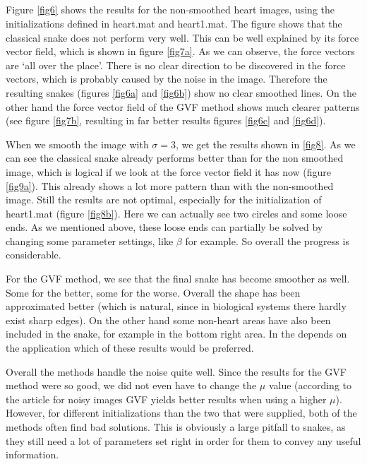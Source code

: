 \documentclass{article}
\begin{document}
\subsection{}
Figure \ref{fig6} shows the results for the non-smoothed heart images, using the initializations defined in heart.mat and heart1.mat. The figure shows that the classical snake does not perform very well. This can be well explained by its force vector field, which is shown in figure \ref{fig7a}. As we can observe, the force vectors are `all over the place'. There is no clear direction to be discovered in the force vectors, which is probably caused by the noise in the image. Therefore the resulting snakes (figures \ref{fig6a} and \ref{fig6b}) show no clear smoothed lines.
On the other hand the force vector field of the GVF method shows much clearer patterns (see figure \ref{fig7b}, resulting in far better results figures \ref{fig6c} and \ref{fig6d}).

When we smooth the image with $\sigma=3$, we get the results shown in \ref{fig8}. As we can see the classical snake already performs better than for the non smoothed image, which is logical if we look at the force vector field it has now (figure \ref{fig9a}). This already shows a lot more pattern than with the non-smoothed image. Still the results are not optimal, especially for the initialization of heart1.mat (figure \ref{fig8b}). Here we can actually see two circles and some loose ends. As we mentioned above, these loose ends can partially be solved by changing some parameter settings, like $\beta$ for example. So overall the progress is considerable. 

For the GVF method, we see that the final snake has become smoother as well. Some for the better, some for the worse. Overall the shape has been approximated better (which is natural, since in biological systems there hardly exist sharp edges). On the other hand some non-heart areas have also been included in the snake, for example in the bottom right area. In the depends on the application which of these results would be preferred.

Overall the methods handle the noise quite well. Since the results for the GVF method were so good, we did not even have to change the $\mu$ value (according to the article for noisy images GVF yields better results when using a higher $\mu$).
However, for different initializations than the two that were supplied, both of the methods often find bad solutions. This is obviously a large pitfall to snakes, as they still need a lot of parameters set right in order for them to convey any useful information.
\end{document}
